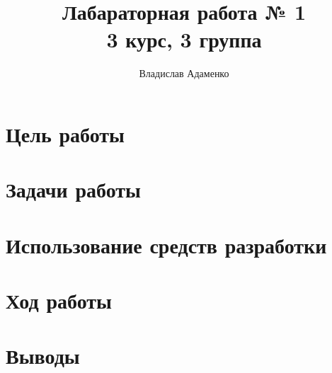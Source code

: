 \documentclass{article}
\begin{document}
    \title{Лабараторная работа № 1\\ 3 курс, 3 группа}
    \author{Владислав Адаменко}
    \maketitle
    
    \section{Цель работы}

    \section{Задачи работы}

    \section{Использование средств разработки}

    \section{Ход работы}

    \section{Выводы}
\end{document}
